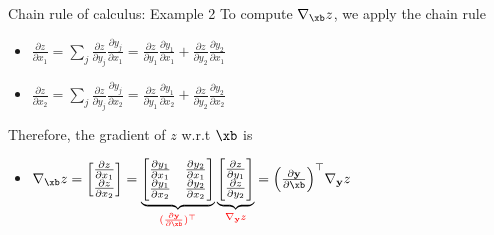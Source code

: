 \begin{frame}{Chain rule of calculus: Example 2}
To compute $\nabla_\xb z$, we apply the chain rule %
  \begin{itemize}
    \item $\frac {\partial z}{\partial x_1} = \sum_j \frac{\partial z}{\partial y_j} \frac{\partial y_j}{\partial x_1} = \frac {\partial z}{\partial y_1} \frac {\partial y_1}{\partial x_1} + \frac {\partial z}{\partial y_2} \frac {\partial y_2}{\partial x_1}$
    \item $\frac {\partial z}{\partial x_2} = \sum_j \frac{\partial z}{\partial y_j} \frac{\partial y_j}{\partial x_2} = \frac {\partial z}{\partial y_1} \frac {\partial y_1}{\partial x_2} + \frac {\partial z}{\partial y_2} \frac {\partial y_2}{\partial x_2}$
  \end{itemize}
  \vspace{2mm}
    Therefore, the gradient of $z$ w.r.t $\xb$ is
    \begin{itemize}
      \item  $\nabla_\xb z = \begin{bmatrix}
               \frac {\partial z}{\partial x_1} \\
               \frac {\partial z}{\partial x_2} \\
             \end{bmatrix} = \underbrace{\begin{bmatrix} \frac{\partial y_1}{\partial x_1}&\frac {\partial y_2}{\partial x_1}\\
                                             \frac {\partial y_1}{\partial x_2}&\frac {\partial y_2}{\partial x_2}\\
             \end{bmatrix}}_{\textcolor{red}{(\frac{\partial \mathbf{y}}{\partial \xb})^\top}} \underbrace{\begin{bmatrix} \frac {\partial z}{\partial y_1} \\
            \frac {\partial z}{\partial y_2} \\ \end{bmatrix}}_{\textcolor{red}{\nabla_{\mathbf{y}} z}} = \Big(\frac{\partial \mathbf{y}}{\partial \xb}\Big)^\top \nabla_{\mathbf{y}} z $
  \end{itemize}
\end{frame}

